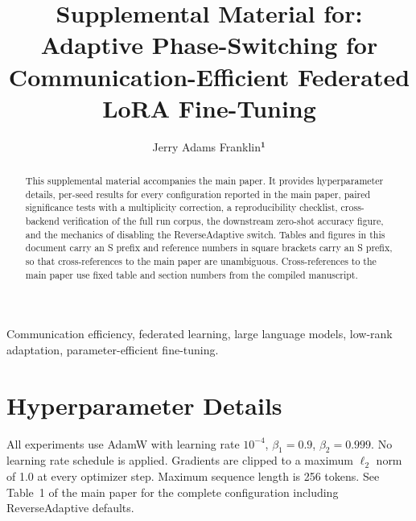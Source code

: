 \documentclass{ieeetj}
\def\authorrefmark#1{\ensuremath{^{\textbf{#1}}}}
\begin{document}


\title{Supplemental Material for: Adaptive Phase-Switching for Communication-Efficient Federated LoRA Fine-Tuning}

\author{Jerry Adams Franklin\authorrefmark{1}}

\begin{abstract}
This supplemental material accompanies the main paper. It provides
hyperparameter details, per-seed results for every configuration reported in
the main paper, paired significance tests with a multiplicity correction, a
reproducibility checklist, cross-backend verification of the full run corpus,
the downstream zero-shot accuracy figure, and the mechanics of disabling the
ReverseAdaptive switch. Tables and figures in this document carry an S prefix
and reference numbers in square brackets carry an S prefix, so that
cross-references to the main paper are unambiguous. Cross-references to the
main paper use fixed table and section numbers from the compiled manuscript.
\end{abstract}

\begin{IEEEkeywords}
Communication efficiency, federated learning, large language models, low-rank adaptation, parameter-efficient fine-tuning.
\end{IEEEkeywords}

\maketitle
\appendices

\section{Hyperparameter Details}
\label{app:hyper}
All experiments use AdamW \cite{loshchilov2019decoupled} with learning rate $10^{-4}$, $\beta_1{=}0.9$, $\beta_2{=}0.999$. No learning rate schedule is applied. Gradients are clipped to a maximum $\ell_2$ norm of 1.0 at every optimizer step. Maximum sequence length is 256 tokens. See Table~1 of the main paper for the complete configuration including ReverseAdaptive defaults.
\end{document}
